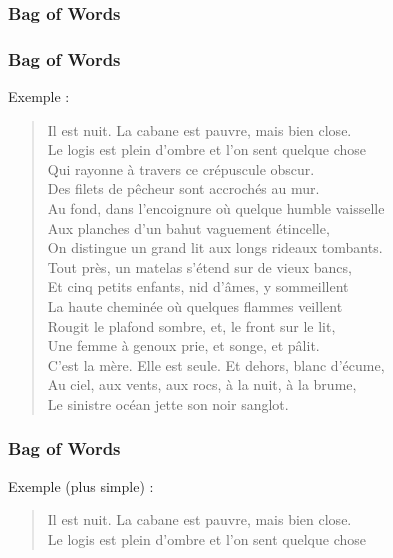 \begin{frame}
\end{frame}

\begin{frame}
  \frametitle{Bag of Words}
\end{frame}

\begin{frame}[t]
  \frametitle{Bag of Words}
  \vspace{1cm}
  Exemple :

  \begin{quote}
    Il est nuit. La cabane est pauvre, mais bien close.\\
    Le logis est plein d'ombre et l'on sent quelque chose\\
    Qui rayonne à travers ce crépuscule obscur.\\
    Des filets de pêcheur sont accrochés au mur.\\
    Au fond, dans l'encoignure où quelque humble vaisselle\\
    Aux planches d'un bahut vaguement étincelle,\\
    On distingue un grand lit aux longs rideaux tombants.\\
    Tout près, un matelas s'étend sur de vieux bancs,\\
    Et cinq petits enfants, nid d'âmes, y sommeillent\\
    La haute cheminée où quelques flammes veillent\\
    Rougit le plafond sombre, et, le front sur le lit,\\
    Une femme à genoux prie, et songe, et pâlit.\\
    C'est la mère. Elle est seule. Et dehors, blanc d'écume,\\
    Au ciel, aux vents, aux rocs, à la nuit, à la brume,\\
    Le sinistre océan jette son noir sanglot.
  \end{quote}
\end{frame}

\begin{frame}[t]
  \frametitle{Bag of Words}
  \vspace{1cm}
  Exemple (plus simple) :

  \begin{quote}
    Il est nuit. La cabane est pauvre, mais bien close.\\
    Le logis est plein d'ombre et l'on sent quelque chose\\
  \end{quote}
\end{frame}

